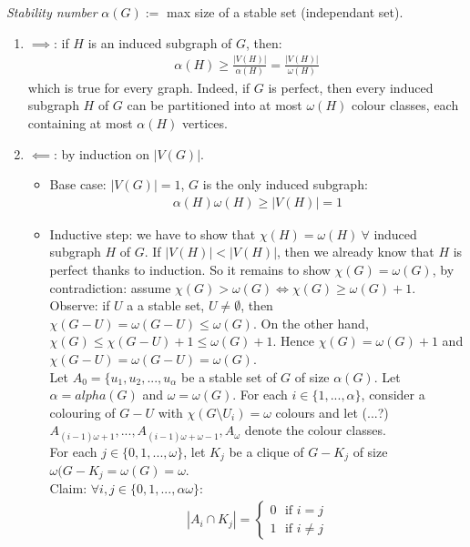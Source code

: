 \textit{Stability number}
$\alpha(G) :=$ max size of a stable set (independant set).
	
	\begin{enumerate}
		\item $\implies$: if $H$ is an induced subgraph of $G$, then:
			\begin{eqnarray}
				\alpha(H) \geq \frac{|V(H)|}{\alpha(H)} = \frac{|V(H)|}{\omega (H)}
			\end{eqnarray}
			which is true for every graph. Indeed, if $G$ is perfect, then every induced subgraph $H$ of $G$ can be partitioned into at most $\omega(H)$ colour classes, each containing at most $\alpha(H)$ vertices.
		\item $\impliedby$: by induction on $|V(G)|$.
			\begin{itemize}
				\item Base case: $|V(G)| =1$, $G$ is the only induced subgraph:\begin{eqnarray}
					\alpha(H) \omega(H) \geq |V(H)| = 1
				\end{eqnarray} 
				\item Inductive step: we have to show that $\chi(H) = \omega(H) ~\forall$ induced subgraph $H$ of $G$. If $|V(H)| < |V(H)|$, then we already know that $H$ is perfect thanks to induction. So it remains to show $\chi(G) = \omega(G)$, by contradiction: assume $\chi(G) > \omega(G) \iff \chi(G) \geq \omega(G) + 1$.\\
					
					Observe: if $U$ a a stable set, $U \neq \emptyset$, then $\chi(G-U) = \omega(G-U) \leq \omega(G)$. On the other hand, $\chi(G) \leq \chi(G-U) + 1 \leq \omega(G) + 1$. Hence $\chi(G) = \omega(G) + 1$ and $\chi(G-U) = \omega(G-U) = \omega(G)$.\\
					
					Let $A_0 = \{u_1, u_2, ..., u_{\alpha}$ be a stable set of $G$ of size $\alpha(G)$. Let $\alpha = alpha(G)$ and $\omega = \omega(G)$. For each $i \in \{1, ..., \alpha\}$, consider a colouring of $G - U$ with $\chi(G \setminus U_i) = \omega$ colours and let (...?) $A_{(i-1) \omega + 1}, ..., A_{(i-1) \omega + \omega - 1}, A_\omega$ denote the colour classes.\\
					
					For each $j \in \{0,1,..., \omega\}$, let $K_j$ be a clique of $G - K_j$ of size $\omega(G - K_j = \omega(G) = \omega$.\\
					
					Claim: $\forall i,j \in \{0,1,...,\alpha \omega \}$:
					\begin{eqnarray}
						|A_i \cap K_j| = \begin{cases}
							0 ~~~ \text{if } i = j\\
							1 ~~~ \text{if } i \neq j
						\end{cases}
					\end{eqnarray}
					

\end{itemize}
\end{enumerate}
